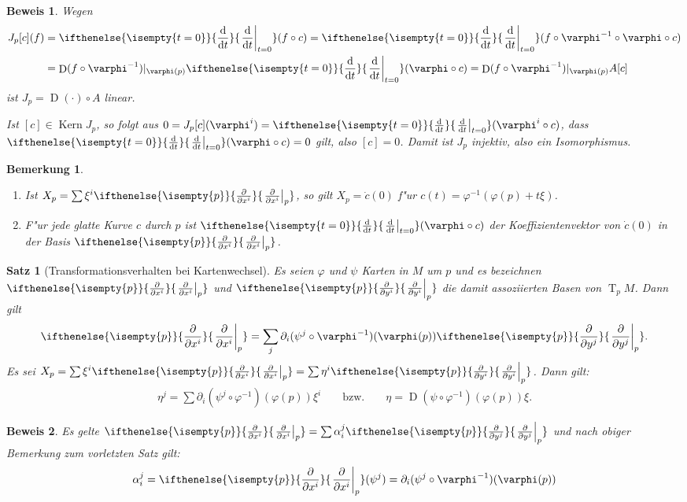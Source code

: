 \documentclass[paper=A4, twoside, chapterprefix=true, bibliography=totoc, headsepline]{scrbook}
\let\temp\phi{}
\let\phi\varphi{}
\let\varphi\temp{}
\let\temp\theta{}
\let\theta\vartheta{}
\let\vartheta\temp{}
\let\temp\epsilon{}
\let\epsilon\varepsilon{}
\let\varepsilon\temp{}
\let\temp\rho{}
\let\rho\varrho{}
\let\varrho\temp{}
\DeclareMathOperator{\D}{D}         %
\DeclareMathOperator{\Kern}{Kern}
\DeclareMathOperator{\T}{T}         %
\newcommand{\dop}{\mathrm{d}}
\newcommand{\difffrac}[3][]{\ifthenelse{\isempty{#1}}{\frac{\dop #2}{\dop #3}}{\left. \frac{\dop #2}{\dop #3} \right|_{#1}}}
\newcommand{\pdifffrac}[3][]{\ifthenelse{\isempty{#1}}{\frac{\partial #2}{\partial #3}}{\left. \frac{\partial #2}{\partial #3} \right|_{#1}}}
\theoremstyle{plain}
\newtheorem{Satz}[Dfn]{Satz}
\theoremstyle{nonumberplain}
\newtheorem{bem}{Bemerkung}
\newtheorem{bew}{Beweis}
\theoremstyle{empty}
\theoremstyle{break}
\begin{document}
\begin{bew}
  Wegen
  \begin{align*}
    J_p[c](f)& = \difffrac[t=0]{}{t}(f\circ c) = \difffrac[t=0]{}{t}(f \circ \phi^{-1} \circ \phi \circ c)\\
    &  = \D(f \circ \phi^{-1})|_{\phi(p)} \difffrac[t=0]{}{t} (\phi \circ c) = \D (f\circ \phi^{-1})|_{\phi(p)}A[c]
  \end{align*}
  ist $J_p = \D(\cdot)\circ A$ linear.

  Ist $[c] \in \Kern J_p$, so folgt aus $0 = J_p[c](\phi^i) = \difffrac[t=0]{}{t}(\phi^i \circ c)$, dass $\difffrac[t=0]{}{t}(\phi \circ c) = 0$ gilt, also $[c] = 0$. Damit ist $J_p$ injektiv, also ein Isomorphismus.
\end{bew}

\begin{bem}
  \begin{enumerate}[label=\arabic*)]
  \item Ist $X_p = \sum \xi^i\pdifffrac[p]{}{x^i}$, so gilt $X_p = \dot c(0)$ f"ur $c(t) = \phi^{-1}(\phi(p) + t\xi)$.
\item F"ur jede glatte Kurve $c$ durch $p$ ist $\difffrac[t=0]{}{t}(\phi \circ c)$ der Koeffizientenvektor von $\dot c(0)$ in der Basis $\pdifffrac[p]{}{x^i}$.
  \end{enumerate}
\end{bem}


\begin{Satz}[Transformationsverhalten bei Kartenwechsel]\label{satz-2-10}
  Es seien $\phi$ und $\psi$ Karten in $M$ um $p$ und es bezeichnen $\pdifffrac[p]{}{x^i}$ und $\pdifffrac[p]{}{y^i}$ die damit assoziierten Basen von $\T_pM$. Dann gilt
  \begin{align*}
    \pdifffrac[p]{}{x^i} = \sum_j \partial_i(\psi^j \circ \phi^{-1})(\phi(p)) \pdifffrac[p]{}{y^j}.
  \end{align*}
Es sei $X_p = \sum \xi^i \pdifffrac[p]{}{x^i} = \sum \eta^i\pdifffrac[p]{}{y^i}$. Dann gilt:
\begin{align*}
  \eta^j = \sum \partial_i(\psi^j \circ \phi^{-1})(\phi(p))\xi^i && \text{ bzw. } &&
  \eta = \D(\psi \circ \phi^{-1})(\phi(p))\xi.
\end{align*}
\end{Satz}

\begin{bew}
  Es gelte $\pdifffrac[p]{}{x^i} = \sum \alpha_i^j\pdifffrac[p]{}{y^j}$ und nach obiger Bemerkung zum vorletzten Satz gilt:
  \begin{align*}
    \alpha_i^j = \pdifffrac[p]{}{x^i}(\psi^j) = \partial_i(\psi^j \circ \phi^{-1})(\phi(p))
  \end{align*}
\end{bew}
\end{document}
